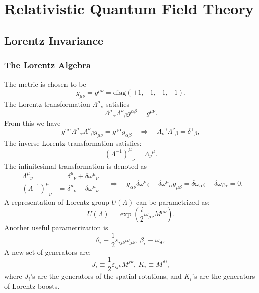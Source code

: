 \chapter{Relativistic Quantum Field Theory}

\section{Lorentz Invariance}

\subsection{The Lorentz Algebra}
The metric is chosen to be 
\begin{equation}
	g_{\mu\nu}=g^{\mu\nu}=\mathrm{diag}(+1,-1,-1,-1).
\end{equation}
The Lorentz transformation ${\Lambda^{\mu}}_{\nu}$ satisfies
\begin{equation}
{\Lambda^{\mu}}_{\alpha}{\Lambda^{\nu}}_{\beta} g^{\alpha\beta} = g^{\mu\nu}.
\end{equation}
From this we have
\begin{equation}
	g^{\gamma\alpha}{\Lambda^{\mu}}_{\alpha}{\Lambda^{\nu}}_{\beta} g_{\mu\nu} 
	= g^{\gamma\alpha}g_{\alpha\beta} 
	\quad \Longrightarrow \quad
	{\Lambda_{\nu}}^{\gamma}{\Lambda^{\nu}}_{\beta} 
	= {\delta^{\gamma}}_{\beta},
\end{equation}
The inverse Lorentz transformation satisfies:
\begin{equation}
	{(\Lambda^{-1})^{\mu}}_{\nu} = {\Lambda_{\nu}}^{\mu}.
\end{equation}
The infinitesimal transformation is denoted as
\begin{equation}
\begin{aligned}
	{\Lambda^{\mu}}_{\nu} &= {\delta^{\mu}}_{\nu}+\delta{\omega^{\mu}}_{\nu} \\
	{(\Lambda^{-1})^\mu}_\nu &= {\delta^{\mu}}_{\nu}-\delta{\omega^\mu}_\nu
\end{aligned}
	\quad \Longrightarrow \quad
	g_{\alpha\nu}\delta{\omega^{\nu}}_{\beta}+\delta{\omega^{\mu}}_{\alpha}g_{\mu\beta}
	=\delta\omega_{\alpha\beta} + \delta\omega_{\beta\alpha} = 0.
\end{equation}
A representation of Lorentz group $U(\Lambda)$ can be parametrized as:
\begin{equation}
	U(\Lambda) = \exp\left(\frac{i}{2}\omega_{\mu\nu}M^{\mu\nu}\right).
\end{equation}
Another useful parametrization is
\begin{equation}
	\theta_i \equiv \frac{1}{2}\varepsilon_{ijk}\omega_{jk}, \ 
	\beta_i \equiv \omega_{i0}.
\end{equation}
A new set of generators are:
\begin{equation}
	J_i \equiv \frac{1}{2}\varepsilon_{ijk}M^{jk},\ 
	K_i \equiv M^{i0},
\end{equation}
where $J_i$'s are the generators of the spatial rotations, and $K_i$'s are the generators of Lorentz boosts.

